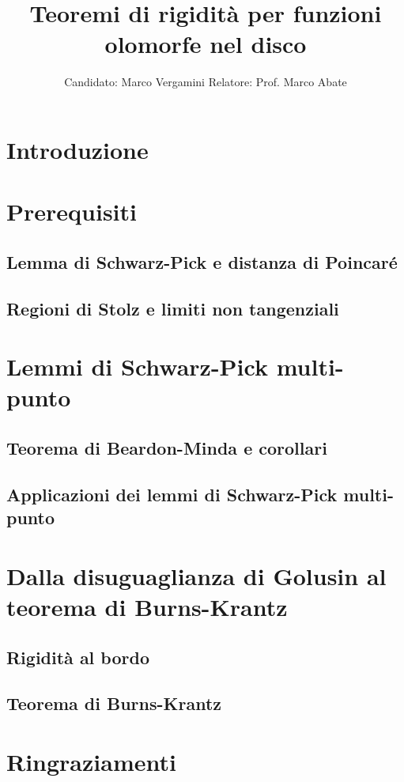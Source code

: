 \documentclass{article}
\title{Teoremi di rigidità per funzioni olomorfe nel disco}
\date{}
\author{Candidato: Marco Vergamini \qquad Relatore: Prof. Marco Abate}
\begin{document}
\maketitle
\newpage
\tableofcontents
\newpage


\section*{Introduzione}


\newpage

\section{Prerequisiti}

\subsection{Lemma di Schwarz-Pick e distanza di Poincaré}


\subsection{Regioni di Stolz e limiti non tangenziali}


\newpage

\section{Lemmi di Schwarz-Pick multi-punto}

\subsection{Teorema di Beardon-Minda e corollari}


\subsection{Applicazioni dei lemmi di Schwarz-Pick multi-punto}


\newpage

\section{Dalla disuguaglianza di Golusin al teorema di Burns-Krantz}

\subsection{Rigidità al bordo}


\subsection{Teorema di Burns-Krantz}


\newpage



\section*{Ringraziamenti}

\end{document}
